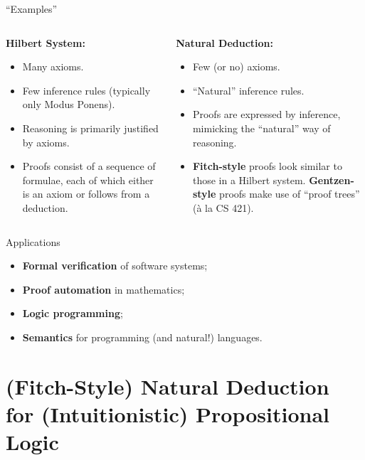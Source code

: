 \documentclass[aspectratio=169]{beamer}
\begin{document}
\begin{frame}{``Examples''}
	\begin{columns}[t]
		\begin{column}{.5\textwidth}
			\textbf{Hilbert System:}
			\begin{itemize}
				\item Many axioms.
				\item Few inference rules (typically only Modus Ponens).
				\item Reasoning is primarily justified by axioms.
				\item Proofs consist of a sequence of formulae, each of which either is an axiom or follows from a deduction.
			\end{itemize}
		\end{column}
		\begin{column}{.5\textwidth}
			\textbf{Natural Deduction:}
			\begin{itemize}
				\item Few (or no) axioms.
				\item ``Natural'' inference rules.
				\item Proofs are expressed by inference, mimicking the ``natural'' way of reasoning.
				\item \textbf{Fitch-style} proofs look similar to those in a Hilbert system.
				      \textbf{Gentzen-style} proofs make use of ``proof trees'' (\`a la CS 421).
			\end{itemize}
		\end{column}
	\end{columns}
\end{frame}

\begin{frame}{Applications}
	\begin{itemize}
		\item \textbf{Formal verification} of software systems;
		\item \textbf{Proof automation} in mathematics;
		\item \textbf{Logic programming};
		\item \textbf{Semantics} for programming (and natural!) languages.
	\end{itemize}
\end{frame}

\section{(Fitch-Style) Natural Deduction for (Intuitionistic) Propositional Logic}
\frame{\sectionpage}
\end{document}
